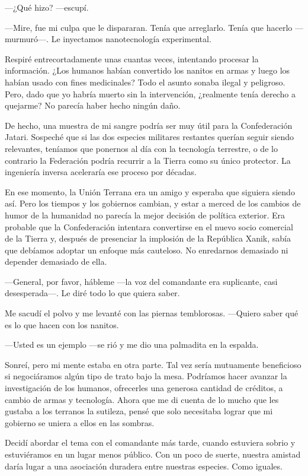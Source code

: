  —¿Qué hizo? —escupí.

—Mire, fue mi culpa que le dispararan. Tenía que arreglarlo. Tenía que hacerlo —murmuró—. Le inyectamos nanotecnología experimental.

Respiré entrecortadamente unas cuantas veces, intentando procesar la información. ¿Los humanos habían convertido los nanitos en armas y luego los habían usado con fines medicinales? Todo el asunto sonaba ilegal y peligroso. Pero, dado que yo habría muerto sin la intervención, ¿realmente tenía derecho a quejarme? No parecía haber hecho ningún daño.

De hecho, una muestra de mi sangre podría ser muy útil para la Confederación Jatari. Sospeché que si las dos especies militares restantes querían seguir siendo relevantes, teníamos que ponernos al día con la tecnología terrestre, o de lo contrario la Federación podría recurrir a la Tierra como su único protector. La ingeniería inversa aceleraría ese proceso por décadas.

En ese momento, la Unión Terrana era un amigo y esperaba que siguiera siendo así. Pero los tiempos y los gobiernos cambian, y estar a merced de los cambios de humor de la humanidad no parecía la mejor decisión de política exterior. Era probable que la Confederación intentara convertirse en el nuevo socio comercial de la Tierra y, después de presenciar la implosión de la República Xanik, sabía que debíamos adoptar un enfoque más cauteloso. No enredarnos demasiado ni depender demasiado de ella.

—General, por favor, hábleme —la voz del comandante era suplicante, casi desesperada—. Le diré todo lo que quiera saber.

Me sacudí el polvo y me levanté con las piernas temblorosas. —Quiero saber qué es lo que hacen con los nanitos.

—Usted es un ejemplo —se rió y me dio una palmadita en la espalda.

Sonreí, pero mi mente estaba en otra parte. Tal vez sería mutuamente beneficioso si negociáramos algún tipo de trato bajo la mesa. Podríamos hacer avanzar la investigación de los humanos, ofrecerles una generosa cantidad de créditos, a cambio de armas y tecnología. Ahora que me di cuenta de lo mucho que les gustaba a los terranos la sutileza, pensé que solo necesitaba lograr que mi gobierno se uniera a ellos en las sombras.

Decidí abordar el tema con el comandante más tarde, cuando estuviera sobrio y estuviéramos en un lugar menos público. Con un poco de suerte, nuestra amistad daría lugar a una asociación duradera entre nuestras especies. Como iguales.